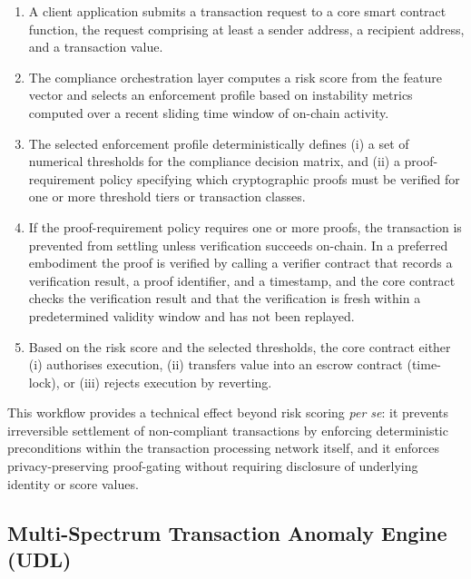 \documentclass[12pt,a4paper]{article}
\begin{document}
\begin{enumerate}[label=(\alph*)]
\item A client application submits a transaction request to a core smart
contract function, the request comprising at least a sender address, a
recipient address, and a transaction value.

\item The compliance orchestration layer computes a risk score from the
feature vector and selects an enforcement profile based on instability
metrics computed over a recent sliding time window of on-chain activity.

\item The selected enforcement profile deterministically defines (i) a set
of numerical thresholds for the compliance decision matrix, and (ii) a
proof-requirement policy specifying which cryptographic proofs must be
verified for one or more threshold tiers or transaction classes.

\item If the proof-requirement policy requires one or more proofs, the
transaction is prevented from settling unless verification succeeds on-chain.
In a preferred embodiment the proof is verified by calling a verifier
contract that records a verification result, a proof identifier, and a
timestamp, and the core contract checks the verification result and that the
verification is fresh within a predetermined validity window and has not been
replayed.

\item Based on the risk score and the selected thresholds, the core contract
either (i) authorises execution, (ii) transfers value into an escrow
contract (time-lock), or (iii) rejects execution by reverting.
\end{enumerate}

This workflow provides a technical effect beyond risk scoring \emph{per se}:
it prevents irreversible settlement of non-compliant transactions by
enforcing deterministic preconditions within the transaction processing
network itself, and it enforces privacy-preserving proof-gating without
requiring disclosure of underlying identity or score values.

\subsection{Multi-Spectrum Transaction Anomaly Engine (UDL)}
\label{sec:udl}
\end{document}
